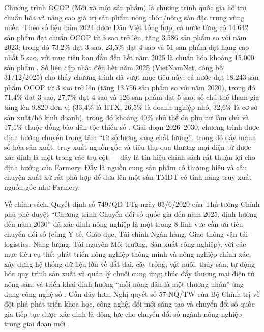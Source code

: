Chương trình OCOP (Mỗi xã một sản phẩm) là chương trình quốc gia hỗ trợ chuẩn hóa và nâng cao giá trị sản phẩm nông thôn/nông sản đặc trưng vùng miền. Theo số liệu năm 2024 được Dân Việt tổng hợp, cả nước từng có 14.642 sản phẩm đạt chuẩn OCOP từ 3 sao trở lên, tăng 3.586 sản phẩm so với năm 2023; trong đó 73,2\% đạt 3 sao, 23,5\% đạt 4 sao và 51 sản phẩm đạt hạng cao nhất 5 sao, với mục tiêu ban đầu đến hết năm 2025 là chuẩn hóa khoảng 15.000 sản phẩm \cite{danviet_2024_ocop}. Số liệu cập nhật đến hết năm 2025 (VietNamNet, công bố 31/12/2025) cho thấy chương trình đã vượt mục tiêu này: cả nước đạt 18.243 sản phẩm OCOP từ 3 sao trở lên (tăng 13.756 sản phẩm so với năm 2020), trong đó 71,4\% đạt 3 sao, 27,7\% đạt 4 sao và 126 sản phẩm đạt 5 sao; số chủ thể tham gia tăng lên 9.820 đơn vị (33,4\% là HTX, 26,5\% là doanh nghiệp nhỏ, 32,6\% là cơ sở sản xuất/hộ kinh doanh), trong đó khoảng 40\% chủ thể do phụ nữ làm chủ và 17,1\% thuộc đồng bào dân tộc thiểu số \cite{vietnamnet_2025_ocop}. Giai đoạn 2026--2030, chương trình được định hướng chuyển trọng tâm ``từ số lượng sang chất lượng'', trong đó đẩy mạnh số hóa sản xuất, truy xuất nguồn gốc và tiêu thụ qua thương mại điện tử được xác định là một trong các trụ cột \cite{vietnamnet_2025_ocop} --- đây là tín hiệu chính sách rất thuận lợi cho định hướng của Farmery. Đây là nguồn cung sản phẩm có thương hiệu và câu chuyện xuất xứ rất phù hợp để đưa lên một sàn TMĐT có tính năng truy xuất nguồn gốc như Farmery.

Về chính sách, Quyết định số 749/QĐ-TTg ngày 03/6/2020 của Thủ tướng Chính phủ phê duyệt ``Chương trình Chuyển đổi số quốc gia đến năm 2025, định hướng đến năm 2030'' đã xác định nông nghiệp là một trong 8 lĩnh vực cần ưu tiên chuyển đổi số (cùng Y tế, Giáo dục, Tài chính-Ngân hàng, Giao thông vận tải-logistics, Năng lượng, Tài nguyên-Môi trường, Sản xuất công nghiệp), với các mục tiêu cụ thể: phát triển nông nghiệp thông minh và nông nghiệp chính xác; xây dựng hệ thống dữ liệu lớn về đất đai, cây trồng, vật nuôi, thủy sản; tự động hóa quy trình sản xuất và quản lý chuỗi cung ứng; thúc đẩy thương mại điện tử nông sản; và triển khai định hướng ``mỗi nông dân là một thương nhân'' ứng dụng công nghệ số \cite{qd749_2020}. Gần đây hơn, Nghị quyết số 57-NQ/TW của Bộ Chính trị về đột phá phát triển khoa học, công nghệ, đổi mới sáng tạo và chuyển đổi số quốc gia tiếp tục được xác định là động lực cho chuyển đổi số ngành nông nghiệp trong giai đoạn mới \cite{nq57_tw}.


